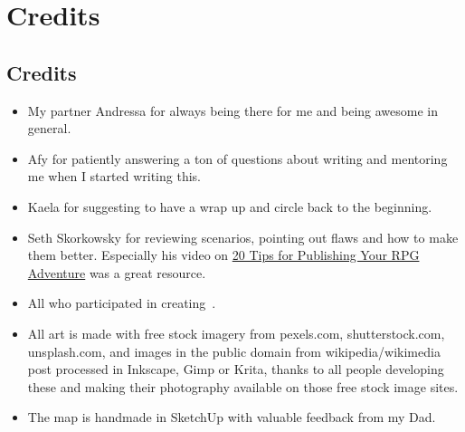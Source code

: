 \section{Credits}%
\label{sec:credits}

\subsection*{Credits}

\begin{itemize}[noitemsep]
  \item My partner Andressa for always being there for me and being awesome in general.
  \item Afy for patiently answering a ton of questions about writing and mentoring me when I started writing this.
  \item Kaela for suggesting to have a wrap up and circle back to the beginning.
  \item Seth Skorkowsky for reviewing scenarios, pointing out flaws and how to make them better.  Especially his video on
        \href{https://www.youtube.com/watch?v=MGxO88C5WFI}{20 Tips for Publishing Your RPG Adventure} was a great resource.
  \item All who participated in creating~\cite{KULT:tex}.
  \item All art is made with free stock imagery from pexels.com, shutterstock.com, unsplash.com, and images in the public
        domain from wikipedia/wikimedia post processed in Inkscape, Gimp or Krita, thanks to all people developing these and
        making their photography available on those free stock image sites.
  \item The map is handmade in SketchUp with valuable feedback from my Dad.
\end{itemize}

\clearpage %
